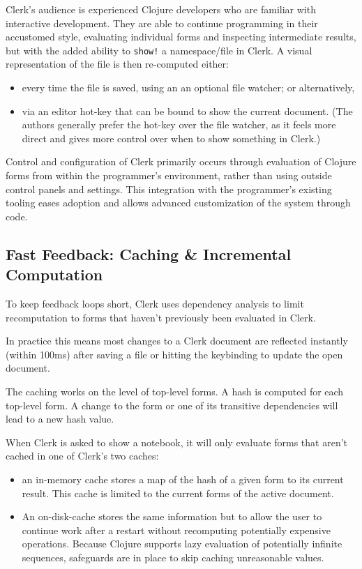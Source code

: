 \documentclass[sigconf,screen]{acmart}
\newcommand{\passthrough}[1]{#1}
\providecommand{\tightlist}{%
  \setlength{\itemsep}{0pt}\setlength{\parskip}{0pt}}
\begin{document}
Clerk's audience is experienced Clojure developers who are familiar with interactive development. They are able to continue programming in their accustomed style, evaluating individual forms and inspecting intermediate results, but with the added ability to \passthrough{\lstinline"show!"} a namespace/file in Clerk. A visual representation of the file is then re-computed either:

\begin{itemize}
\tightlist
\item
  every time the file is saved, using an an optional file watcher; or alternatively,
\item
  via an editor hot-key that can be bound to show the current document. (The authors generally prefer the hot-key over the file watcher, as it feels more direct and gives more control over when to show something in Clerk.)
\end{itemize}

Control and configuration of Clerk primarily occurs through evaluation of Clojure forms from within the programmer's environment, rather than using outside control panels and settings. This integration with the programmer's existing tooling eases adoption and allows advanced customization of the system through code.

\hypertarget{id}{%
\subsection{Fast Feedback: Caching \& Incremental Computation}\label{id}}

To keep feedback loops short, Clerk uses dependency analysis to limit recomputation to forms that haven't previously been evaluated in Clerk.

In practice this means most changes to a Clerk document are reflected instantly (within 100ms) after saving a file or hitting the keybinding to update the open document.

The caching works on the level of top-level forms. A hash is computed for each top-level form. A change to the form or one of its transitive dependencies will lead to a new hash value.

When Clerk is asked to show a notebook, it will only evaluate forms that aren't cached in one of Clerk's two caches:

\begin{itemize}
\tightlist
\item
  an in-memory cache stores a map of the hash of a given form to its current result. This cache is limited to the current forms of the active document.
\item
  An on-disk-cache stores the same information but to allow the user to continue work after a restart without recomputing potentially expensive operations. Because Clojure supports lazy evaluation of potentially infinite sequences, safeguards are in place to skip caching unreasonable values.
\end{itemize}
\end{document}
